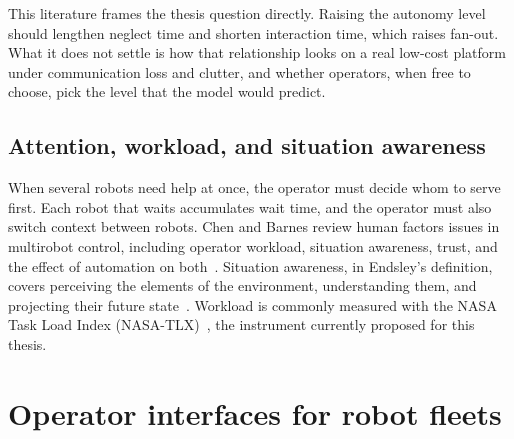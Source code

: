 This literature frames the thesis question directly.
Raising the autonomy level should lengthen neglect time and shorten interaction time, which raises fan-out.
What it does not settle is how that relationship looks on a real low-cost platform under communication loss and clutter, and whether operators, when free to choose, pick the level that the model would predict.

\subsection{Attention, workload, and situation awareness}

When several robots need help at once, the operator must decide whom to serve first.
Each robot that waits accumulates wait time, and the operator must also switch context between robots.
Chen and Barnes review human factors issues in multirobot control, including operator workload, situation awareness, trust, and the effect of automation on both~\citep{chen2014teaming}.
Situation awareness, in Endsley's definition, covers perceiving the elements of the environment, understanding them, and projecting their future state~\citep{endsley1995sa}.
Workload is commonly measured with the NASA Task Load Index (NASA-TLX)~\citep{hart1988tlx}, the instrument currently proposed for this thesis.

\section{Operator interfaces for robot fleets}
\label{sec:bg-interfaces}

